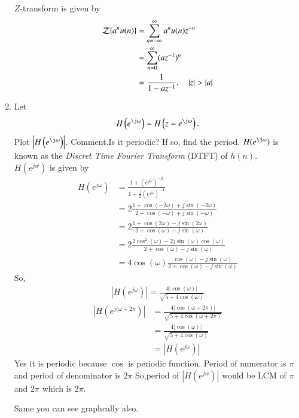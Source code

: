 \documentclass[journal,12pt,twocolumn]{IEEEtran}
\renewcommand\thesection{\arabic{section}}
\begin{document}
\begin{enumerate}[label=\thesection.\arabic*]
\solution $Z$-transform is given by
\begin{align}
	\mathcal{Z}\{a^nu(n)\}&=\sum_{n=-\infty}^\infty a^nu(n)z^{-n}\\
	&=\sum_{n=0}^\infty (az^{-1})^{n}\\
	&=\frac{1}{1-az^{-1}},\quad \left\vert z\right\vert > \left\vert a\right\vert
\end{align}
\item 
Let
\begin{equation}
H\brak{e^{\j \omega}} = H\brak{z = e^{\j \omega}}.
\end{equation}
Plot $\abs{H\brak{e^{\j \omega}}}$.  Comment.Is it periodic? If so, find the
period.  $H(e^{\j \omega})$ is
known as the {\em Discret Time Fourier Transform} (DTFT) of $h(n)$.
\\
\solution $H(e^{jw})$ is given by
\begin{align}
	H(e^{j\omega})&=\frac{1+(e^{j\omega})^{-2}}{1+\frac{1}{2}(e^{j\omega})^{-1}}\\
	&=2\frac{1+\cos(-2\omega)+j\sin(-2\omega)}{2+\cos(-\omega)+j\sin(-\omega)}\\
	&=2\frac{1+\cos(2\omega)-j\sin(2\omega)}{2+\cos(\omega)-j\sin(\omega)}\\
	&=2\frac{2\cos^2(\omega)-2j\sin(\omega)\cos(\omega)}{2+\cos(\omega)-j\sin(\omega)}\\
	&=4\cos(\omega)\frac{\cos(\omega)-j\sin(\omega)}{2+\cos(\omega)-j\sin(\omega)}
\end{align}
So,
\begin{align}
	|H(e^{j\omega})|=\frac{4|\cos(\omega)|}{\sqrt{5+4\cos(\omega)}}
\end{align}
\begin{align}
|H(e^{j(\omega+2\pi})|&=\frac{4|\cos(\omega+2\pi)|}{\sqrt{5+4\cos(\omega+2\pi)}}\\
&=\frac{4|\cos(\omega)|}{\sqrt{5+4\cos(\omega)}}\\
&=|H(e^{j\omega})|
\end{align}
Yes it is periodic because $\cos$ is periodic function.
Period of numerator is $\pi$ and period of denominator is $2\pi$
So,period of $|H(e^{jw})|$ would be LCM of $\pi$ and $2\pi$ which is $2\pi$.

Same you can see graphcally also.
 

\end{enumerate}
\end{document}
